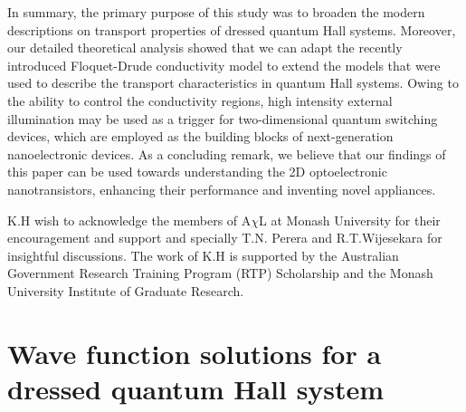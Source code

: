 \documentclass[
 reprint,
 amsmath,amssymb,
 aps,
 prb,
]{revtex4-2}
\begin{document}
In summary, the primary purpose of this study was to broaden the modern descriptions on transport properties of dressed quantum Hall systems. Moreover, our detailed theoretical analysis showed that we can adapt the recently introduced Floquet-Drude conductivity model to extend the models that were used to describe the transport characteristics in quantum Hall systems. Owing to the ability to control the conductivity regions, high intensity external illumination may be used as a trigger for two-dimensional quantum switching devices, which are employed as the building blocks of next-generation nanoelectronic devices. As a concluding remark, we believe that our findings of this paper can be used towards understanding the 2D optoelectronic nanotransistors, enhancing their performance and inventing novel appliances.

\begin{acknowledgments}
K.H wish to acknowledge the members of A$\chi$L at Monash University for their encouragement and support and specially T.N. Perera and R.T.Wijesekara for insightful discussions. The work of K.H is supported by the Australian Government Research Training Program (RTP) Scholarship and the Monash University Institute of Graduate Research.
\end{acknowledgments}

\appendix

\section{\label{appendix_a} Wave function solutions for a dressed quantum Hall system}
\end{document}
